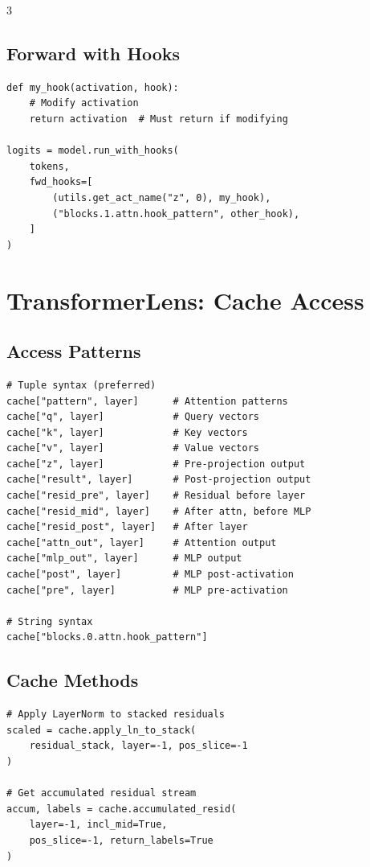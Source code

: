 \documentclass[10pt,a4paper,landscape]{article}
\begin{document}
\begin{multicols}{3}
\subsection{Forward with Hooks}
\begin{lstlisting}
def my_hook(activation, hook):
    # Modify activation
    return activation  # Must return if modifying

logits = model.run_with_hooks(
    tokens,
    fwd_hooks=[
        (utils.get_act_name("z", 0), my_hook),
        ("blocks.1.attn.hook_pattern", other_hook),
    ]
)
\end{lstlisting}

\section{TransformerLens: Cache Access}

\subsection{Access Patterns}
\begin{lstlisting}
# Tuple syntax (preferred)
cache["pattern", layer]      # Attention patterns
cache["q", layer]            # Query vectors
cache["k", layer]            # Key vectors
cache["v", layer]            # Value vectors
cache["z", layer]            # Pre-projection output
cache["result", layer]       # Post-projection output
cache["resid_pre", layer]    # Residual before layer
cache["resid_mid", layer]    # After attn, before MLP
cache["resid_post", layer]   # After layer
cache["attn_out", layer]     # Attention output
cache["mlp_out", layer]      # MLP output
cache["post", layer]         # MLP post-activation
cache["pre", layer]          # MLP pre-activation

# String syntax
cache["blocks.0.attn.hook_pattern"]
\end{lstlisting}

\subsection{Cache Methods}
\begin{lstlisting}
# Apply LayerNorm to stacked residuals
scaled = cache.apply_ln_to_stack(
    residual_stack, layer=-1, pos_slice=-1
)

# Get accumulated residual stream
accum, labels = cache.accumulated_resid(
    layer=-1, incl_mid=True,
    pos_slice=-1, return_labels=True
)


\end{lstlisting}
\end{multicols}
\end{document}
